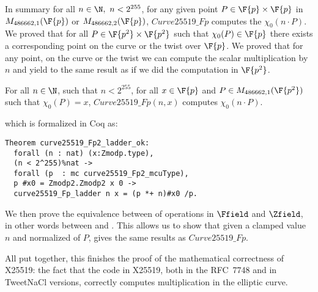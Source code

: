 In summary for all $n \in \N,\ n < 2^{255}$, for any given point $P\in\F{p}\times\F{p}$
in $M_{486662,1}(\F{p})$ or $M_{486662,2}(\F{p})$, $Curve25519\_Fp$
computes the $\chi_0(n \cdot P)$.
We proved that for all $P \in \F{p^2}\times\F{p^2}$ such that $\chi_0(P) \in \F{p}$
there exists a corresponding point on the curve or the twist over $\F{p}$.
We proved that for any point, on the curve or the twist we can compute the
scalar multiplication by $n$ and yield to the same result as if we did the
computation in $\F{p^2}$.
\begin{theorem}
  \label{thm:general-scalarmult}
  For all $n \in \N$, such that $n < 2^{255}$,
  for all $x \in \F{p}$ and $P \in M_{486662,1}(\F{p^2})$ such that $\chi_0(P) = x$,
  $Curve25519\_Fp(n,x)$ computes $\chi_0(n \cdot P)$.
\end{theorem}
which is formalized in Coq as:
\begin{lstlisting}[language=Coq]
Theorem curve25519_Fp2_ladder_ok:
  forall (n : nat) (x:Zmodp.type),
  (n < 2^255)%nat ->
  forall (p  : mc curve25519_Fp2_mcuType),
  p #x0 = Zmodp2.Zmodp2 x 0 ->
  curve25519_Fp_ladder n x = (p *+ n)#x0 /p.
\end{lstlisting}

We then prove the equivalence between of operations in $\Ffield$ and $\Zfield$,
in other words between  and .
This allows us to show that given a clamped value $n$ and normalized \xcoord of $P$,
 gives the same results as $Curve25519\_Fp$.

All put together, this finishes the proof of the mathematical correctness of X25519: the fact that the code in X25519, both in the RFC~7748 and
in TweetNaCl versions, correctly computes multiplication in the elliptic curve.
